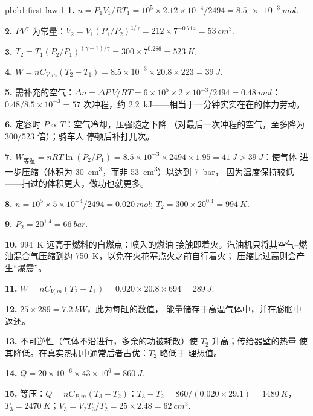 \begin{solution}{pb:b1:first-law:1}
\textbf{1.} $n = P_1V_1/RT_1 = 10^5 \times 2.12\times10^{-4}/2494 = \qty{8.5e-3}{mol}$.

\textbf{2.} $PV^\gamma$ 为常量：$V_2 = V_1(P_1/P_2)^{1/\gamma} = 212 \times
7^{-0.714} = \qty{53}{cm^3}$.

\textbf{3.} $T_2 = T_1(P_2/P_1)^{(\gamma - 1)/\gamma} = 300 \times 7^{0.286} =
\qty{523}{K}$.

\textbf{4.} $W = nC_{V,m}(T_2 - T_1) = 8.5\times10^{-3} \times 20.8 \times 223 =
\qty{39}{J}$.

\textbf{5.} 需补充的空气：$\Delta n = \Delta P\,V/RT = 6\times10^5 \times 2\times10^{-3}/
2494 = \qty{0.48}{mol}$：$0.48/8.5\times10^{-3} = 57$ 次冲程，约
\qty{2.2}{kJ}——相当于一分钟实实在在的体力劳动。

\textbf{6.} 定容时 $P \propto T$：空气冷却，压强随之下降
（对最后一次冲程的空气，至多降为 $300/523$ 倍）；骑车人
停顿后补打几次。

\textbf{7.} $W_{\text{等温}} = nRT\ln(P_2/P_1) = 8.5\times10^{-3} \times 2494 \times
1.95 = \qty{41}{J} > \qty{39}{J}$：使气体
进一步压缩（体积为 \qty{30}{cm^3}，而非 \qty{53}{cm^3}）以达到 \qty{7}{bar}，
因为温度保持较低——扫过的体积更大，做功也就更多。

\textbf{8.} $n = 10^5 \times 5\times10^{-4}/2494 = \qty{0.020}{mol}$; $T_2 =
300 \times 20^{0.4} = \qty{994}{K}$.

\textbf{9.} $P_2 = 20^{1.4} = \qty{66}{bar}$.

\textbf{10.} \qty{994}{K} 远高于燃料的自燃点：喷入的燃油
接触即着火。汽油机只将其空气–燃油混合气压缩到约
\qty{750}{K}，以免在火花塞点火之前自行着火；
压缩比过高则会产生“爆震”。

\textbf{11.} $W = nC_{V,m}(T_2 - T_1) = 0.020 \times 20.8 \times 694 = \qty{289}{J}$.

\textbf{12.} $25 \times 289 = \qty{7.2}{kW}$，此为每缸的数值，
能量储存于高温气体中，并在膨胀中返还。

\textbf{13.} 不可逆性（气体不沿进行，多余的功被耗散）使 $T_2$ 升高；传给器壁的热量
使其降低。在真实热机中通常后者占优：$T_2$ 略低于
理想值。

\textbf{14.} $Q = 20\times10^{-6} \times 43\times10^6 = \qty{860}{J}$.

\textbf{15.} 等压：$Q = nC_{P,m}(T_3 - T_2)$：$T_3 - T_2 = 860/(0.020 \times
29.1) = \qty{1480}{K}$，$T_3 = \qty{2470}{K}$；$V_3 = V_2T_3/T_2 = 25 \times
2.48 = \qty{62}{cm^3}$.


\end{solution}
